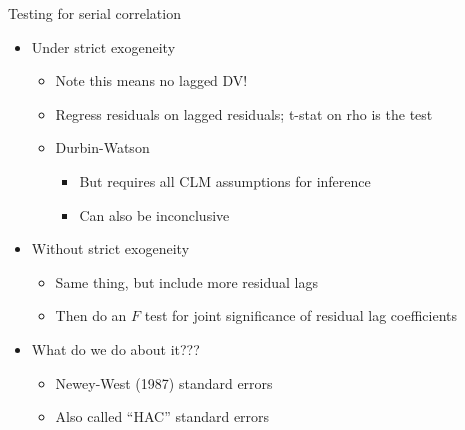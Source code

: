 \documentclass[
  ignorenonframetext,
]{beamer}
\providecommand{\tightlist}{%
  \setlength{\itemsep}{0pt}\setlength{\parskip}{0pt}}
\newcommand{\setsep}{\setlength{\itemsep}{3pt}}
\newcommand{\setskip}{\setlength{\parskip}{3pt}}
\renewcommand{\tightlist}{\setsep\setskip}
\begin{document}
\begin{frame}{Testing for serial correlation}
\protect\hypertarget{testing-for-serial-correlation}{}
\begin{itemize}[<+->]
\tightlist
\item
  Under strict exogeneity

  \begin{itemize}[<+->]
  \tightlist
  \item
    Note this means no lagged DV!
  \item
    Regress residuals on lagged residuals; t-stat on rho is the test
  \item
    Durbin-Watson

    \begin{itemize}[<+->]
    \tightlist
    \item
      But requires all CLM assumptions for inference
    \item
      Can also be inconclusive
    \end{itemize}
  \end{itemize}
\item
  Without strict exogeneity

  \begin{itemize}[<+->]
  \tightlist
  \item
    Same thing, but include more residual lags
  \item
    Then do an \(F\) test for joint significance of residual lag coefficients
  \end{itemize}
\item
  What do we do about it???

  \begin{itemize}[<+->]
  \tightlist
  \item
    Newey-West (1987) standard errors
  \item
    Also called ``HAC'' standard errors
  \end{itemize}
\end{itemize}
\end{frame}
\end{document}
